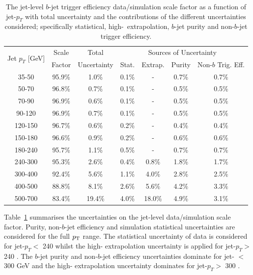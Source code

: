 \begin{table}[!ht]
  \begin{tabular}{|c||c|c||c|c|c|c|}
    \hline
    \multirow{2}{*}{Jet $p_T$ [GeV]} & Scale  & Total       & \multicolumn{4}{c|}{Sources of Uncertainty} \\ \cline{4-7} 
                                     & Factor & Uncertainty & Stat.  & Extrap.  & Purity  & Non-$b$ Trig. Eff. \\
    \hline
    35-50   & 95.9\% & 1.0\% & 0.1\% & - & 0.7\% & 0.7\% \\
    50-70   & 96.8\% & 0.7\% & 0.1\% & - & 0.5\% & 0.5\% \\
    70-90   & 96.9\% & 0.6\% & 0.1\% & - & 0.5\% & 0.5\% \\
    90-120  & 96.9\% & 0.7\% & 0.1\% & - & 0.5\% & 0.5\% \\
    120-150 & 96.7\% & 0.6\% & 0.2\% & - & 0.4\% & 0.4\% \\
    150-180 & 96.6\% & 0.9\% & 0.2\% & - & 0.6\% & 0.6\% \\
    180-240 & 95.7\% & 1.1\% & 0.5\% & - & 0.7\% & 0.7\% \\
    \hline
    240-300 & 95.3\% & 2.6\% & 0.4\% & 0.8\% & 1.8\% & 1.7\% \\
    300-400 & 92.4\% & 5.6\% & 1.1\% & 4.0\% & 2.8\% & 2.5\% \\
    400-500 & 88.8\% & 8.1\% & 2.6\% & 5.6\% & 4.2\% & 3.3\% \\
    500-700 & 83.4\% & 19.4\% & 4.0\% & 18.0\% & 4.9\% & 3.1\% \\
    \hline
\end{tabular}
  \caption[The jet-level $b$-jet trigger efficiency data/simulation scale factor  as a function of jet-$p_{T}$ with total uncertainties and the contributions]
          {The jet-level $b$-jet trigger efficiency data/simulation scale factor as a function of jet-$p_{T}$
    with total uncertainty and the contributions of the different uncertainties considered;
    specifically statistical, high-\pT~extrapolation, $b$-jet purity and non-$b$-jet trigger efficiency.}
\label{tab:bTrig_jetSys}
\end{table}


Table~\ref{tab:bTrig_jetSys} summarises the uncertainties on the jet-level data/simulation scale factor.
Purity, non-$b$-jet efficiency and simulation statistical uncertainties are considered for the full $p_{\mathrm{T}}$ range.
The statistical uncertainty of data is considered for jet-$p_T <$ 240 \GeV{}
whilst the high-\pT{} extrapolation uncertainty is applied for jet-$p_T >$ 240 \GeV.
The $b$-jet purity and non-$b$-jet efficiency uncertainties dominate for jet-\pT{} $<$ 300 GeV and the high-\pT{} extrapolation uncertainty dominates for jet-$p_T >$ 300 \GeV.

